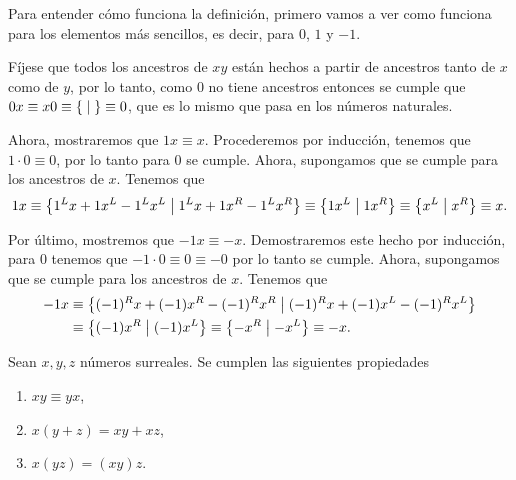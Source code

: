     \begin{example}
        Para entender c\'omo funciona la definici\'on, primero vamos a ver como funciona para los elementos m\'as sencillos, es decir, para $0$, $1$ y $-1$.

        F\'ijese que todos los ancestros de $xy$ est\'an hechos a partir de ancestros tanto de $x$ como de $y$, por lo tanto, como $0$ no tiene ancestros entonces se cumple que $0x \equiv x0 \equiv \left\{\;\middle|\; \right\} \equiv 0$, que es lo mismo que pasa en los n\'umeros naturales.
        
        Ahora, mostraremos que $1x \equiv x$. Procederemos por inducci\'on, tenemos que $1\cdot 0 \equiv 0$, por lo tanto para $0$ se cumple. Ahora, supongamos que se cumple para los ancestros de $x$. Tenemos que 
        \[
            1x \equiv \left\{1^Lx + 1x^L - 1^Lx^L\;\middle|\; 1^Lx + 1x^R - 1^Lx^R\right\} \equiv \left\{1x^L\;\middle|\; 1x^R\right\} \equiv \left\{x^L\;\middle|\; x^R\right\} \equiv x.
        \]

        Por \'ultimo, mostremos que $-1x \equiv -x$. Demostraremos este hecho por inducci\'on, para $0$ tenemos que $-1\cdot 0\equiv 0 \equiv -0$ por lo tanto se cumple. Ahora, supongamos que se cumple para los ancestros de $x$. Tenemos que 
        \begin{align*}
            -1x & \equiv \left\{(-1)^Rx + (-1)x^R - (-1)^Rx^R\;\middle|\; (-1)^Rx + (-1)x^L - (-1)^Rx^L\right\} \\
             & \equiv \left\{(-1)x^R\;\middle|\; (-1)x^L\right\} \equiv \left\{-x^R\;\middle|\; -x^L\right\} \equiv -x.
        \end{align*}
    \end{example}

    \begin{theorem}
        Sean $x,y,z$ n\'umeros surreales. Se cumplen las siguientes propiedades
        \begin{enumerate}[nosep]
            \item $xy\equiv yx$,
            \item $x(y+z) = xy + xz$,
            \item $x(yz) = (xy)z$.
        \end{enumerate}
    \end{theorem}


